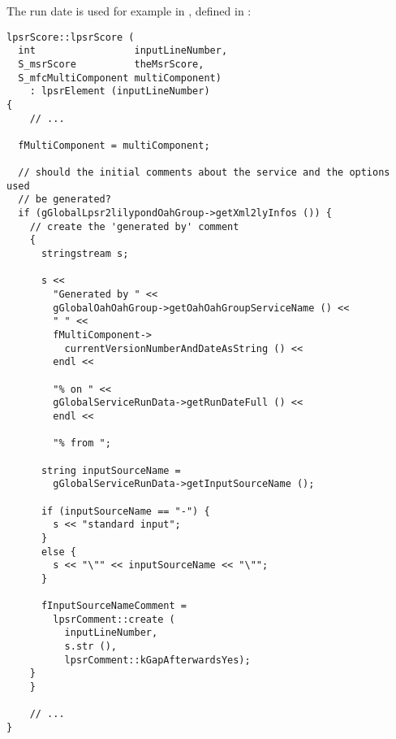 The run date is used for example in , defined in :%
\begin{lstlisting}[language=CPlusPlus]
lpsrScore::lpsrScore (
  int                 inputLineNumber,
  S_msrScore          theMsrScore,
  S_mfcMultiComponent multiComponent)
    : lpsrElement (inputLineNumber)
{
	// ...

  fMultiComponent = multiComponent;

  // should the initial comments about the service and the options used
  // be generated?
  if (gGlobalLpsr2lilypondOahGroup->getXml2lyInfos ()) {
    // create the 'generated by' comment
    {
      stringstream s;

      s <<
        "Generated by " <<
        gGlobalOahOahGroup->getOahOahGroupServiceName () <<
        " " <<
        fMultiComponent->
          currentVersionNumberAndDateAsString () <<
        endl <<

        "% on " <<
        gGlobalServiceRunData->getRunDateFull () <<
        endl <<

        "% from ";

      string inputSourceName =
        gGlobalServiceRunData->getInputSourceName ();

      if (inputSourceName == "-") {
        s << "standard input";
      }
      else {
        s << "\"" << inputSourceName << "\"";
      }

      fInputSourceNameComment =
        lpsrComment::create (
          inputLineNumber,
          s.str (),
          lpsrComment::kGapAfterwardsYes);
    }
	}

	// ...
}
\end{lstlisting}


